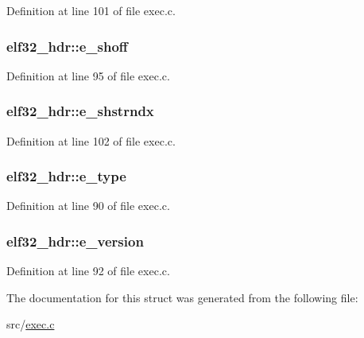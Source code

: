 Definition at line 101 of file exec.\+c.

\hypertarget{structelf32__hdr_afd8ce4ec0f05960b2306f98625be6db0}{
\subsubsection[{e\+\_\+shoff}]{ elf32\+\_\+hdr\+::e\+\_\+shoff}}\label{structelf32__hdr_afd8ce4ec0f05960b2306f98625be6db0}


Definition at line 95 of file exec.\+c.

\hypertarget{structelf32__hdr_afd7ed18333923147918975fdfa4ee99a}{
\subsubsection[{e\+\_\+shstrndx}]{ elf32\+\_\+hdr\+::e\+\_\+shstrndx}}\label{structelf32__hdr_afd7ed18333923147918975fdfa4ee99a}


Definition at line 102 of file exec.\+c.

\hypertarget{structelf32__hdr_a01aab87d9a8f658d41a1162158c07878}{
\subsubsection[{e\+\_\+type}]{ elf32\+\_\+hdr\+::e\+\_\+type}}\label{structelf32__hdr_a01aab87d9a8f658d41a1162158c07878}


Definition at line 90 of file exec.\+c.

\hypertarget{structelf32__hdr_a4324ae029dfd1967979b984a2f3e14e4}{
\subsubsection[{e\+\_\+version}]{ elf32\+\_\+hdr\+::e\+\_\+version}}\label{structelf32__hdr_a4324ae029dfd1967979b984a2f3e14e4}


Definition at line 92 of file exec.\+c.



The documentation for this struct was generated from the following file\+:\begin{DoxyCompactItemize}
\item 
src/\hyperlink{exec_8c}{exec.\+c}\end{DoxyCompactItemize}
